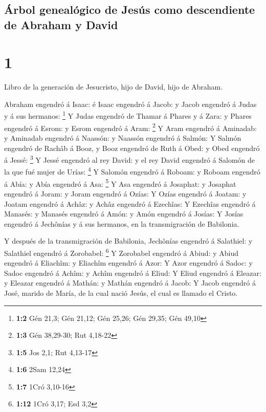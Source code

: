 \hypertarget{uxe1rbol-genealuxf3gico-de-jesuxfas-como-descendiente-de-abraham-y-david}{%
\subsection{Árbol genealógico de Jesús como descendiente de Abraham y
David}\label{uxe1rbol-genealuxf3gico-de-jesuxfas-como-descendiente-de-abraham-y-david}}

\hypertarget{section}{%
\section{1}\label{section}}

 Libro de la generación de Jesucristo, hijo de David, hijo
de Abraham.

 Abraham engendró á Isaac: é Isaac engendró á Jacob: y Jacob
engendró á Judas y á sus hermanos: \footnote{\textbf{1:2} Gén 21,3; Gén
  21,12; Gén 25,26; Gén 29,35; Gén 49,10}  Y Judas engendró
de Thamar á Phares y á Zara: y Phares engendró á Esrom: y Esrom engendró
á Aram: \footnote{\textbf{1:3} Gén 38,29-30; Rut 4,18-22}  Y
Aram engendró á Aminadab: y Aminadab engendró á Naassón: y Naassón
engendró á Salmón:  Y Salmón engendró de Rachâb á Booz, y
Booz engendró de Ruth á Obed: y Obed engendró á Jessé: \footnote{\textbf{1:5}
  Jos 2,1; Rut 4,13-17}  Y Jessé engendró al rey David: y el
rey David engendró á Salomón de la que fué mujer de Urías: \footnote{\textbf{1:6}
  2Sam 12,24}  Y Salomón engendró á Roboam: y Roboam
engendró á Abía: y Abía engendró á Asa: \footnote{\textbf{1:7} 1Cró
  3,10-16}  Y Asa engendró á Josaphat: y Josaphat engendró á
Joram: y Joram engendró á Ozías:  Y Ozías engendró á Joatam:
y Joatam engendró á Achâz: y Achâz engendró á Ezechîas:  Y
Ezechîas engendró á Manasés: y Manasés engendró á Amón: y Amón engendró
á Josías:  Y Josías engendró á Jechônías y á sus hermanos,
en la transmigración de Babilonia.

 Y después de la transmigración de Babilonia, Jechônías
engendró á Salathiel: y Salathiel engendró á Zorobabel: \footnote{\textbf{1:12}
  1Cró 3,17; Esd 3,2}  Y Zorobabel engendró á Abiud: y
Abiud engendró á Eliachîm: y Eliachîm engendró á Azor:  Y
Azor engendró á Sadoc: y Sadoc engendró á Achîm: y Achîm engendró á
Eliud:  Y Eliud engendró á Eleazar: y Eleazar engendró á
Mathán: y Mathán engendró á Jacob:  Y Jacob engendró á
José, marido de María, de la cual nació Jesús, el cual es llamado el
Cristo.

